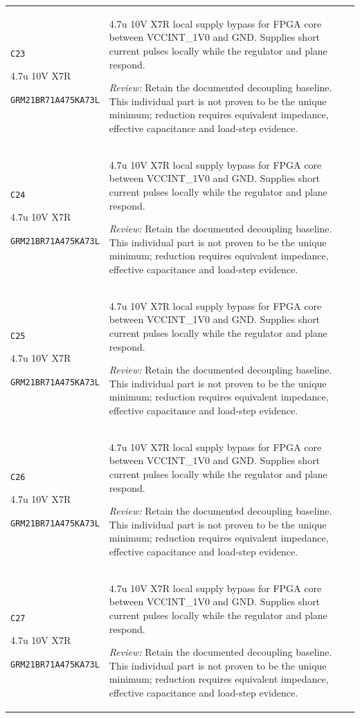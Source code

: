 \documentclass[10pt,a4paper]{article}
\begin{document}
\begin{longtable}{@{}P{46mm}P{117mm}@{}}
\nolinkurl{C23}\par 4.7u 10V X7R\par\scriptsize \nolinkurl{GRM21BR71A475KA73L} & 4.7u 10V X7R local supply bypass for FPGA core between VCCINT\_1V0 and GND. Supplies short current pulses locally while the regulator and plane respond.\par\smallskip\textit{Review:} Retain the documented decoupling baseline. This individual part is not proven to be the unique minimum; reduction requires equivalent impedance, effective capacitance and load-step evidence. \\
\nolinkurl{C24}\par 4.7u 10V X7R\par\scriptsize \nolinkurl{GRM21BR71A475KA73L} & 4.7u 10V X7R local supply bypass for FPGA core between VCCINT\_1V0 and GND. Supplies short current pulses locally while the regulator and plane respond.\par\smallskip\textit{Review:} Retain the documented decoupling baseline. This individual part is not proven to be the unique minimum; reduction requires equivalent impedance, effective capacitance and load-step evidence. \\
\nolinkurl{C25}\par 4.7u 10V X7R\par\scriptsize \nolinkurl{GRM21BR71A475KA73L} & 4.7u 10V X7R local supply bypass for FPGA core between VCCINT\_1V0 and GND. Supplies short current pulses locally while the regulator and plane respond.\par\smallskip\textit{Review:} Retain the documented decoupling baseline. This individual part is not proven to be the unique minimum; reduction requires equivalent impedance, effective capacitance and load-step evidence. \\
\nolinkurl{C26}\par 4.7u 10V X7R\par\scriptsize \nolinkurl{GRM21BR71A475KA73L} & 4.7u 10V X7R local supply bypass for FPGA core between VCCINT\_1V0 and GND. Supplies short current pulses locally while the regulator and plane respond.\par\smallskip\textit{Review:} Retain the documented decoupling baseline. This individual part is not proven to be the unique minimum; reduction requires equivalent impedance, effective capacitance and load-step evidence. \\
\nolinkurl{C27}\par 4.7u 10V X7R\par\scriptsize \nolinkurl{GRM21BR71A475KA73L} & 4.7u 10V X7R local supply bypass for FPGA core between VCCINT\_1V0 and GND. Supplies short current pulses locally while the regulator and plane respond.\par\smallskip\textit{Review:} Retain the documented decoupling baseline. This individual part is not proven to be the unique minimum; reduction requires equivalent impedance, effective capacitance and load-step evidence. \\

\end{longtable}
\end{document}

